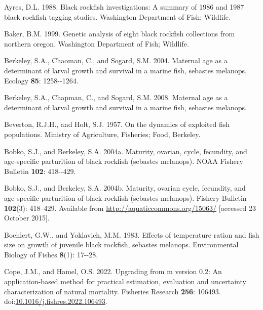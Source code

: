 \documentclass[11pt,
  english,
  letterpaper,
]{article}
\newlength{\cslhangindent}
\newenvironment{CSLReferences}[2] %
 {%
  \setlength{\parindent}{0pt}
  \ifodd #1 \everypar{\setlength{\hangindent}{\cslhangindent}}\ignorespaces\fi
  \ifnum #2 > 0
  \setlength{\parskip}{#2\baselineskip}
  \fi
 }%
 {}
\begin{document}
\hypertarget{refs}{}
\begin{CSLReferences}{1}{0}
\leavevmode{}%
Ayres, D.L. 1988. Black rockfish investigations: A summary of 1986 and 1987 black rockfish tagging studies. Washington Department of Fish; Wildlife.

\leavevmode{}%
Baker, B.M. 1999. Genetic analysis of eight black rockfish collections from northern oregon. Washington Department of Fish; Wildlife.

\leavevmode{}%
Berkeley, S.A., Chaoman, C., and Sogard, S.M. 2004. Maternal age as a determinant of larval growth and survival in a marine fish, sebastes melanops. Ecology \textbf{85}: 1258-\/-1264.

\leavevmode{}%
Berkeley, S.A., Chapman, C., and Sogard, S.M. 2008. Maternal age as a determinant of larval growth and survival in a marine fish, sebastes melanops.

\leavevmode{}%
Beverton, R.J.H., and Holt, S.J. 1957. On the dynamics of exploited fish populations. Ministry of Agriculture, Fisheries; Food, Berkeley.

\leavevmode{}%
Bobko, S.J., and Berkeley, S.A. 2004a. Maturity, ovarian, cycle, fecundity, and age-specific parturition of black rockfish (sebastes melanops). NOAA Fishery Bulletin \textbf{102}: 418-\/-429.

\leavevmode{}%
Bobko, S.J., and Berkeley, S.A. 2004b. Maturity, ovarian cycle, fecundity, and age-specific parturition of black rockfish (sebastes melanops). Fishery Bulletin \textbf{102}(3): 418--429. Available from \url{http://aquaticcommons.org/15063/} {[}accessed 23 October 2015{]}.

\leavevmode{}%
Boehlert, G.W., and Yoklavich, M.M. 1983. Effects of temperature ration and fish size on growth of juvenile black rockfish, sebastes melanops. Environmental Biology of Fishes \textbf{8}(1): 17-\/-28.

\leavevmode{}%
Cope, J.M., and Hamel, O.S. 2022. Upgrading from m version 0.2: An application-based method for practical estimation, evaluation and uncertainty characterization of natural mortality. Fisheries Research \textbf{256}: 106493. doi:\href{https://doi.org/10.1016/j.fishres.2022.106493}{10.1016/j.fishres.2022.106493}.


\end{CSLReferences}
\end{document}
